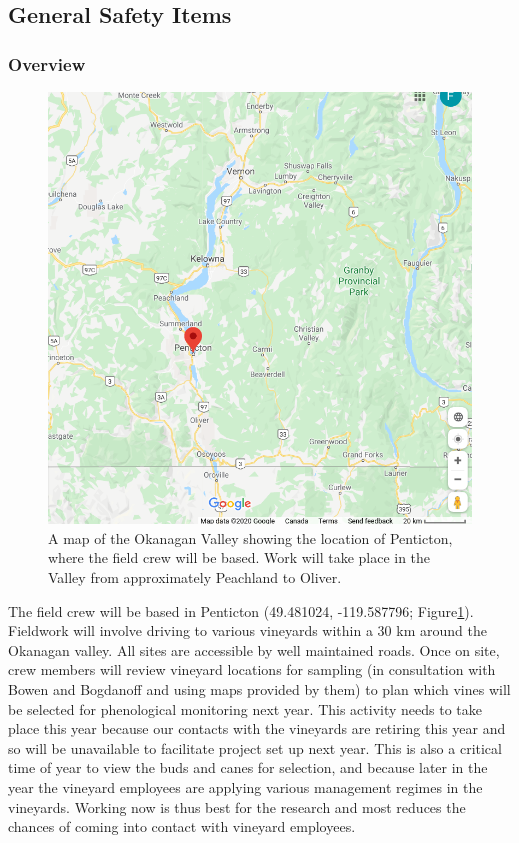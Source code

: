 \documentclass[11pt,letter]{article}
\begin{document}
\subsection {General Safety Items}

\subsubsection{Overview}
\begin{figure}
  \includegraphics[width=\linewidth]{penticton.png}
  \caption{A map of the Okanagan Valley showing the location of Penticton, where the field crew will be based. Work will take place in the Valley from approximately Peachland to Oliver.}
  \label{fig:OkanMap}
\end{figure}
The field crew will be based in Penticton (49.481024, -119.587796; Figure\ref{fig:OkanMap}). Fieldwork will involve driving to various vineyards within a 30 km around the Okanagan valley. All sites are accessible by well maintained roads. Once on site, crew members will review vineyard locations for sampling (in consultation with Bowen and Bogdanoff and using maps provided by them) to plan which vines will be selected for phenological monitoring next year. This activity needs to take place this year because our contacts with the vineyards are retiring this year and so will be unavailable to facilitate project set up next year. This is also a critical time of year to view the buds and canes for selection, and because later in the year the vineyard employees are applying various management regimes in the vineyards. Working now is thus best for the research and most reduces the chances of coming into contact with vineyard employees.   
\end{document}
